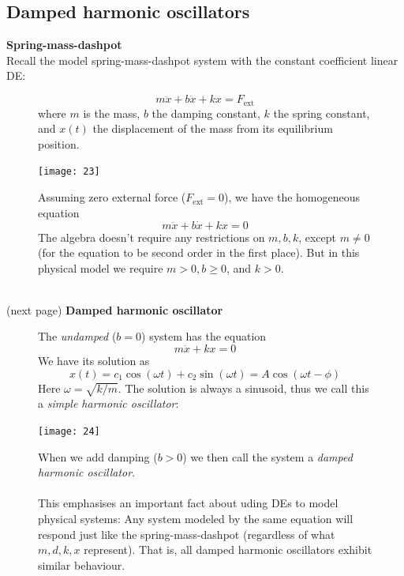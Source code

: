 \documentclass{report}
\begin{document}
\subsection{Damped harmonic oscillators}
\textbf{Spring-mass-dashpot}\\
Recall the model spring-mass-dashpot system with the constant coefficient linear DE:
\begin{figure}[h]
\begin{equation*}
m\ddot{x}+b\dot{x}+kx=F_\text{ext}
\end{equation*}
where $m$ is the mass, $b$ the damping constant, $k$ the spring constant, and $x(t)$ the displacement
of the mass from its equilibrium position.
\begin{center}
\texttt{[image: 23]}\\
\end{center}
Assuming zero external force ($F_\text{ext}=0$), we have
the homogeneous equation
\begin{equation*}
m\ddot{x}+b\dot{x}+kx=0
\end{equation*}
The algebra doesn't require any restrictions on $m,b,k$, except $m\neq0$ (for the equation to be second order
in the first place). But in this physical model we require $m>0,b\geq0$, and $k>0$.
\end{figure}\\
(next page)
\newpage
\noindent\textbf{Damped harmonic oscillator}
\begin{figure}[h]
The \textit{undamped} ($b=0$) system has the equation
\begin{equation*}
m\ddot{x}+kx=0
\end{equation*}
We have its solution as
\begin{equation*}
x(t)=c_1\cos(\omega t)+c_2\sin(\omega t)=A\cos(\omega t-\phi)
\end{equation*}
Here $\omega=\sqrt{k/m}$. The solution is always a sinusoid, thus we call this a 
\textit{simple harmonic oscillator}:
\begin{center}
\texttt{[image: 24]}\\
\end{center}
When we add damping ($b>0$) we then call the system a \textit{damped harmonic oscillator}.\\
\vspace{1mm}\\
This emphasises an important fact about uding DEs to model physical systems:
Any system modeled by the same equation will respond just like the spring-mass-dashpot (regardless of what $m,d,k,x$
represent). That is, all damped harmonic oscillators exhibit similar behaviour.
\end{figure}
\newpage
\end{document}
